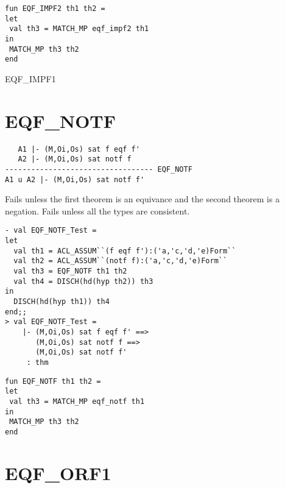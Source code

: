 \IMPLEMENTATION
\begin{holboxed}
\begin{verbatim}
fun EQF_IMPF2 th1 th2 =
let
 val th3 = MATCH_MP eqf_impf2 th1
in
 MATCH_MP th3 th2
end
\end{verbatim}
\end{holboxed}
\SEEALSO
EQF\_IMPF1

\ENDDOC

\section{EQF\_NOTF}



\egroup

\DESCRIBE
\begin{verbatim}
   A1 |- (M,Oi,Os) sat f eqf f'
   A2 |- (M,Oi,Os) sat notf f
---------------------------------- EQF_NOTF
A1 u A2 |- (M,Oi,Os) sat notf f'
\end{verbatim}

\FAILURE
Fails unless the first theorem is an equivance and the second theorem
is a negation.  Fails unless all the types are consistent.

\EXAMPLE
\begin{holboxed}
\begin{verbatim}
- val EQF_NOTF_Test =
let
  val th1 = ACL_ASSUM``(f eqf f'):('a,'c,'d,'e)Form``
  val th2 = ACL_ASSUM``(notf f):('a,'c,'d,'e)Form``
  val th3 = EQF_NOTF th1 th2
  val th4 = DISCH(hd(hyp th2)) th3
in
  DISCH(hd(hyp th1)) th4
end;;
> val EQF_NOTF_Test =
    |- (M,Oi,Os) sat f eqf f' ==>
       (M,Oi,Os) sat notf f ==>
       (M,Oi,Os) sat notf f'
     : thm
\end{verbatim}
\end{holboxed}

\IMPLEMENTATION
\begin{holboxed}
\begin{verbatim}
fun EQF_NOTF th1 th2 =
let
 val th3 = MATCH_MP eqf_notf th1
in
 MATCH_MP th3 th2
end
\end{verbatim}
\end{holboxed}


\ENDDOC

\section{EQF\_ORF1}

